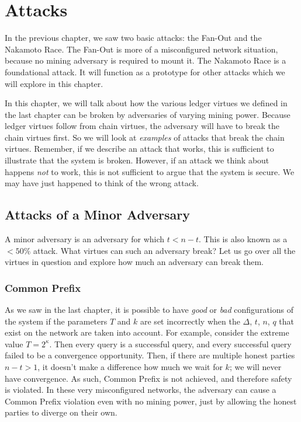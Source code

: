 \chapter{Attacks}\label{chapter.attacks}

In the previous chapter, we saw two basic attacks: the Fan-Out and the Nakamoto Race.
The Fan-Out is more of a misconfigured network situation, because no mining adversary
is required to mount it. The Nakamoto Race is a foundational attack.
It will function as a prototype for other attacks which we will explore in this chapter.

In this chapter, we will talk about how the various ledger virtues we defined in the
last chapter can be broken by adversaries of varying mining power. Because ledger virtues
follow from chain virtues, the adversary will have to break the chain virtues first.
So we will look at \emph{examples} of attacks that break the chain virtues. Remember,
if we describe an attack that works, this is sufficient to illustrate that the system
is broken. However, if an attack we think about happens \emph{not} to work, this is not
sufficient to argue that the system is secure. We may have just happened to think of
the wrong attack.

\section{Attacks of a Minor Adversary}

A minor adversary is an adversary for which $t < n - t$. This is also known as
a $< 50\%$ attack. What virtues can such an adversary break? Let us go over all the
virtues in question and explore how much an adversary can break them.

\subsection*{Common Prefix}
As we saw in the last chapter, it is possible to have \emph{good} or
\emph{bad} configurations of the system if the parameters $T$ and $k$ are set incorrectly
when the $\Delta$, $t$, $n$, $q$ that exist on the network are taken into account.
For example, consider the extreme value
$T = 2^\kappa$. Then every query is a successful query, and every successful query
failed to be a convergence opportunity. Then, if there are multiple honest parties
$n - t > 1$, it doesn't make a difference how much we wait for $k$; we will never
have convergence. As such, Common Prefix is not achieved, and therefore safety is
violated. In these very misconfigured networks, the adversary can cause a Common
Prefix violation even with no mining power, just by allowing the honest parties
to diverge on their own.

